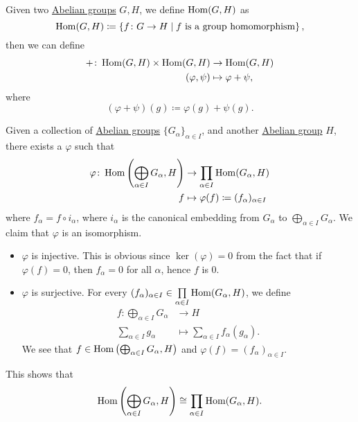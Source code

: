 \begin{definition}
	Given two \hyperref[def:Abelian-group]{Abelian groups} \(G, H\), we define \(\operatorname{Hom} (G, H)\) as
	\[
		\operatorname{Hom} (G, H) \coloneqq \left\{f\colon G\to H \mid \text{\(f\) is a group homomorphism} \right\},
	\]
	then we can define
	\[
		\begin{split}
			+\colon \operatorname{Hom} (G, H)\times \operatorname{Hom} (G, H) & \to \operatorname{Hom} (G, H)         \\
			(\varphi , \psi )                     & \mapsto \varphi + \psi,
		\end{split}
	\]
	where
	\[
		(\varphi + \psi )(g)\coloneqq \varphi (g) + \psi (g).
	\]
\end{definition}

\begin{remark}\label{rmk:relation-between-direct-sum-and-direct-product}
	Given a collection of \hyperref[def:Abelian-group]{Abelian groups} \(\{G_\alpha \}_{\alpha \in I}\), and another \hyperref[def:Abelian-group]{Abelian group} \(H\), there exists a
	\(\varphi \) such that
	\[
		\begin{split}
			\varphi \colon \operatorname{Hom} \left(\bigoplus_{\alpha \in I}G_\alpha , H\right) & \to \prod\limits_{\alpha \in I}\operatorname{Hom} (G_\alpha , H)      \\
			f                                                                     & \mapsto \varphi (f)\coloneqq (f_\alpha )_{\alpha \in I}
		\end{split}
	\]
	where \(f_\alpha = f\circ i_\alpha \), where \(i_\alpha \) is the canonical embedding from \(G_\alpha \) to \(\bigoplus_{\alpha \in I}G _\alpha \). We claim
	that \(\varphi \) is an isomorphism.

	\begin{itemize}
		\item \(\varphi \) is injective. This is obvious since \(\ker  (\varphi ) = 0\) from the fact that if \(\varphi (f) = 0\), then \(f_\alpha  = 0\) for all \(\alpha\), hence
		      \(f\) is \(0\).
		\item \(\varphi \) is surjective. For every \((f_\alpha )_{\alpha \in I}\in \prod\limits_{\alpha \in I}\operatorname{Hom} (G_\alpha , H) \), we define
		      \[
			      \begin{split}
				      f\colon \bigoplus_{\alpha \in I}G_\alpha & \to H                                                   \\
				      \sum\limits_{\alpha \in I}^{}g_\alpha    & \mapsto \sum\limits_{\alpha \in I}f_\alpha (g_\alpha ).
			      \end{split}
		      \]
		      We see that \(f\in \operatorname{Hom} \left(\bigoplus_{\alpha \in I}G_\alpha , H\right)\) and \(\varphi (f) = (f_\alpha )_{\alpha \in I}\).
	\end{itemize}

	This shows that
	\[
		\operatorname{Hom} \left(\bigoplus_{\alpha \in I}G_\alpha , H\right)\cong \prod\limits_{\alpha \in I}\operatorname{Hom} (G_\alpha , H).
	\]
\end{remark}

